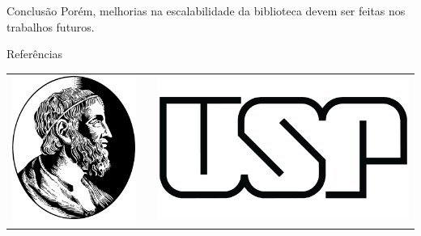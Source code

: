 \documentclass[final]{beamer}
\newlength{\onecolwid}
\begin{document}
\begin{frame}[t]
\begin{columns}[t]
\begin{column}{\onecolwid}
\begin{block}{Conclusão}
Porém, melhorias na escalabilidade da biblioteca devem ser feitas nos trabalhos futuros.



\end{block}


\begin{block}{Referências}

\nocite{*} %
\small{
}

\end{block}


\begin{center}
\begin{tabular}{ccc}
\includegraphics[width=0.2\linewidth]{IME.png} & \hfill & \includegraphics[width=0.4\linewidth]{USP.jpg}
\end{tabular}
\end{center}


\end{column}
\end{columns}
\end{frame}
\end{document}
